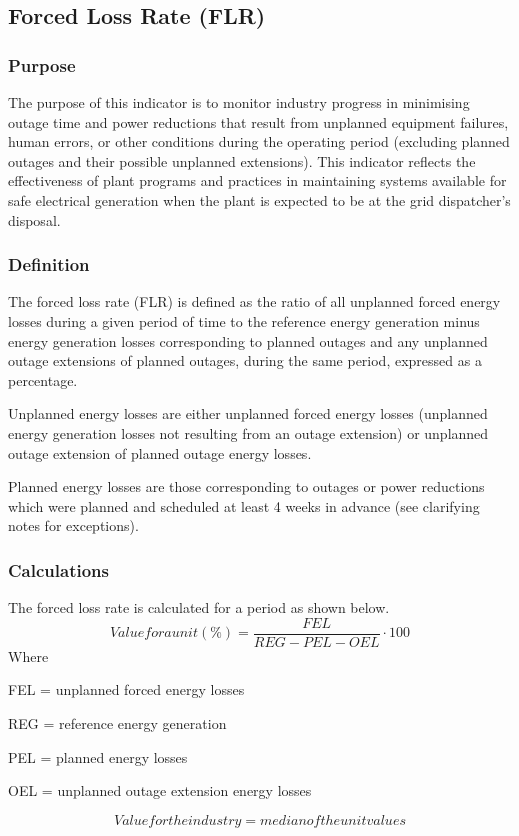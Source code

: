 \subsection{Forced Loss Rate (FLR)}

\subsubsection{Purpose}

The purpose of this indicator is to monitor industry progress in
minimising outage time and power reductions that result from unplanned
equipment failures, human errors, or other conditions during the
operating period (excluding planned outages and their possible
unplanned extensions). This indicator reflects the effectiveness of
plant programs and practices in maintaining systems available for safe
electrical generation when the plant is expected to be at the grid
dispatcher’s disposal.

\subsubsection{Definition}

The forced loss rate (FLR) is defined as the ratio of all unplanned
forced energy losses during a given period of time to the reference
energy generation minus energy generation losses corresponding to
planned outages and any unplanned outage extensions of planned
outages, during the same period, expressed as a percentage. 

Unplanned energy losses are either unplanned forced energy losses
(unplanned energy generation losses not resulting from an outage
extension) or unplanned outage extension of planned outage energy
losses. 

Planned energy losses are those corresponding to outages or power
reductions which were planned and scheduled at least 4 weeks in
advance (see clarifying notes for exceptions).

\subsubsection{Calculations}

The forced loss rate is calculated for a period as shown below.
$$ Value for a unit (\%) = \frac{FEL}{REG-PEL-OEL} \cdot 100 $$		
Where	

FEL =	unplanned forced energy losses

REG =	reference energy generation 

PEL =	planned energy losses 

 OEL =	 unplanned outage extension energy losses

$$ Value for the industry = median of the unit values $$